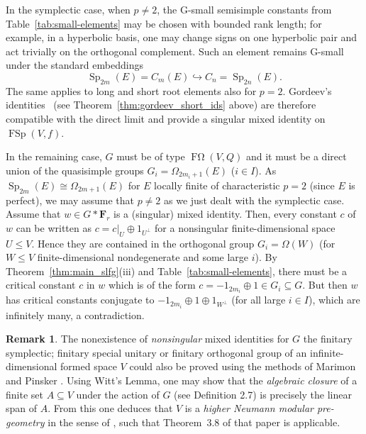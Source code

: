 \documentclass[a4paper,12pt]{amsproc}
\DeclareMathOperator{\Sp}{Sp}%
\newcommand{\rest}[1]{\left.#1\right\rvert}%
\DeclareMathOperator{\FSp}{FSp}%
\DeclareMathOperator{\FOmega}{F\Omega}%
\theoremstyle{plain}
\theoremstyle{definition}
\newtheorem{remark}[definition]{Remark}
\begin{document}
In the symplectic case, when $p\neq 2$, the G-small semisimple constants from Table~\ref{tab:small-elements} may be chosen with bounded rank length; for example, in a hyperbolic basis, one may change signs on one hyperbolic pair and act trivially on the orthogonal complement. Such an element remains G-small
under the standard embeddings $$\Sp_{2m}(E)=C_m(E)\hookrightarrow C_n=\Sp_{2n}(E).$$ The same applies to long and short root elements also for $p=2$. Gordeev's identities~\cite{gordeev1997freedom} (see Theorem~\ref{thm:gordeev_short_ids} above) are therefore compatible with the direct limit and provide a singular mixed identity on $\FSp(V,f)$.

In the remaining case, $G$ must be of type $\FOmega(V,Q)$ and it must be a direct union of the quasisimple groups $G_i=\Omega_{2m_i+1}(E)$ ($i\in I$). As $\Sp_{2m}(E)\cong\Omega_{2m+1}(E)$ for $E$ locally finite of characteristic $p=2$ (since $E$ is perfect), we may assume that $p\neq 2$ as we just dealt with the symplectic case. Assume that $w\in G\ast\mathbf{F}_r$ is a (singular) mixed identity. Then, every constant $c$ of $w$ can be written as $c=\rest{c}_U\oplus 1_{U^\perp}$ for a nonsingular finite-dimensional space $U\leq V$. Hence they are contained in the orthogonal group $G_i=\Omega(W)$ (for $W\leq V$ finite-dimensional nondegenerate and some large $i$). By Theorem~\ref{thm:main_slfg}(iii) and Table~\ref{tab:small-elements}, there must be a critical constant $c$ in $w$ which is of the form $c=-1_{2m_i}\oplus 1\in G_i\subseteq G$. But then $w$ has critical constants conjugate to $-1_{2m_i}\oplus 1\oplus 1_{W^\perp}$ (for all large $i\in I$), which are infinitely many, a contradiction.

\begin{remark}
The nonexistence of \emph{nonsingular} mixed identities for $G$ the finitary symplectic; 
finitary special unitary or finitary orthogonal group of an infinite-dimensional 
formed space $V$ could also be 
proved using the methods of Marimon and Pinsker \cite{marimonpinsker2026all}. 
Using Witt's Lemma, one may show that the \emph{algebraic closure} 
of a finite set $A \subseteq V$ under the action of $G$ (see \cite{marimonpinsker2026all} 
Definition 2.7) is precisely the linear span of $A$. 
From this one deduces that $V$ is a \emph{higher Neumann modular pre-geometry} 
in the sense of \cite{marimonpinsker2026all}, such that Theorem~3.8 of that 
paper is applicable.
\end{remark}

\appendix
\end{document}
